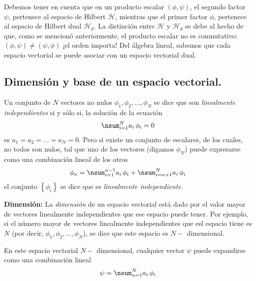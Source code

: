 Debemos tener en cuenta que en un producto escalar $(\phi, \psi)$, el segundo factor $\psi$, pertenece al espacio de Hilbert $\mathcal{H}$, mientras que el primer factor $\phi$, pertenece al espacio de Hilbert dual $\mathcal{H}_{d}$. La distinción entre $\mathcal{H}$ y $\mathcal{H}_{d}$ se debe al hecho de que, como se mencionó anteriormente, el producto escalar no es conmutativo: $(\phi, \psi) \neq (\psi, \phi)$ ¡el orden importa! Del álgebra lineal, sabemos que cada espacio vectorial se puede asociar con un espacio vectorial dual.

\subsection{Dimensión y base de un espacio vectorial.}

Un conjunto de $N$ vectores no nulos $\phi_{1}, \phi_{2}, \ldots, \phi_{N}$ se dice que son \emph{linealmente independientes} si y sólo si, la solución de la ecuación
\begin{align}
\nsum_{i=1}^{N} a_{i} \, \phi_{i} = 0
\label{eq:ecuacion_02_11}
\end{align}
es $a_{1} = a_{2} = \ldots = a_{N} = 0$. Pero si existe un conjunto de escalares, de los cuales, no todos son nulos, tal que uno de los vectores (digamos $\phi_{N}$) puede expresarse como una combinación lineal de los otros
\begin{align}
\phi_{n} = \nsum_{i=1}^{n-1} a_{i} \, \phi_{i} + \nsum_{i=n+1}^{N} a_{i} \, \phi_{i}
\label{eq:ecuacion_02_12} 
\end{align} 
el conjunto $\left\{ \phi_{i} \right\}$ se dice que es \emph{linealmente independiente}.

\textbf{Dimensión: } La \emph{dimensión} de un espacio vectorial está dado por el valor mayor de vectores linealmente independientes que ese espacio puede tener. Por ejemplo, si el número mayor de vectores linealmente independientes que esl espacio tiene es $N$ (por decir, $\phi_{1}, \phi_{2}, \ldots, \phi_{N}$), se dice que este espacio es $N-$ dimensional.
\par
En este espacio vectorial $N-$ dimensional, cualquier vector $\psi$ puede expandirse como una combinación lineal
\begin{align}
\psi = \nsum_{n=1}^{N} a_{i} \, \phi_{i}
\label{eq:ecuacion_02_13}
\end{align}

